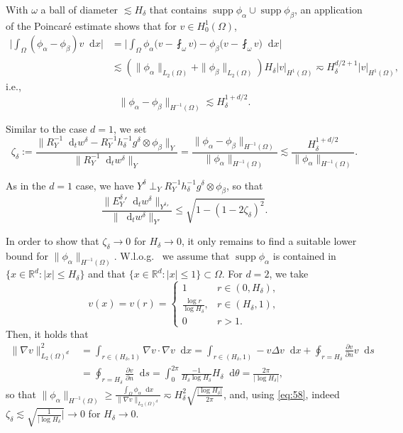 \documentclass{amsart}
\numberwithin{equation}{section}
\newcommand{\R}{\mathbb R}
\DeclareMathOperator{\supp}{supp}
\newcommand{\1}{\mathbb 1}
\newcommand*\diff{\mathop{}\!\mathrm{d}}
\newcommand{\be}{\begin{equation}}
\newcommand{\ee}{\end{equation}}
\begin{document}
With $\omega$ a ball of diameter $\lesssim H_\delta$ that contains $\supp \phi_\alpha \cup \supp \phi_\beta$, an application of the Poincar\'{e} estimate shows that for $v \in H^1_0(\Omega)$,
\begin{align*}
\Big|\int_\Omega (\phi_\alpha- \phi_\beta) v \diff x\Big|&=\Big|\int_\Omega \phi_\alpha\Big(v-\fint_\omega v\Big)-\phi_\beta\Big(v-\fint_\omega v\Big)\diff x\Big|
\\
&\lesssim (\|\phi_\alpha\|_{L_2(\Omega)} +\|\phi_\beta\|_{L_2(\Omega)}) H_\delta |v|_{H^1(\Omega)} \eqsim H_\delta^{d/2+1}  |v|_{H^1(\Omega)},
\end{align*}
i.e.,
$$
\| \phi_\alpha- \phi_\beta\|_{H^{-1}(\Omega)} \lesssim H_\delta^{1+d/2}.
$$

Similar to the case $d=1$, we set
\be \label{eq:58}
\zeta_\delta:=\frac{\|R_Y^{-1}\diff_t w^\delta-R_Y^{-1} h_\delta^{-1} g^\delta \otimes \phi_\beta\|_{Y}}{\|R_Y^{-1}\diff_t w^\delta\|_Y} =\frac{\|\phi_\alpha-\phi_\beta\|_{H^{-1}(\Omega)}}{\|\phi_\alpha\|_{H^{-1}(\Omega)}} \lesssim \frac{H_\delta^{1+d/2}}{\|\phi_\alpha\|_{H^{-1}(\Omega)}}.
\ee


As in the $d=1$ case, we have $Y^\delta \perp_Y R_Y^{-1} h_\delta^{-1} g^\delta \otimes \phi_\beta$, so that
$$
\frac{\|{E_Y^\delta}'\diff_t  w^\delta\|_{{Y^\delta}'}}{\|\diff_t  w^\delta\|_{Y'}} \leq \sqrt{1-(1-2 \zeta_\delta)^2}.
$$

In order to show that $\zeta_\delta \rightarrow 0$ for $H_\delta \rightarrow 0$,  it only remains to find a suitable lower bound for $\|\phi_\alpha\|_{H^{-1}(\Omega)}$. 
W.l.o.g.~ we assume that $\supp \phi_\alpha$ is contained in \mbox{$\{x \in \R^d\colon |x| \leq H_\delta\}$} and that $\{x \in \R^d\colon |x| \leq 1\} \subset \Omega$. For $d=2$, we take
$$
v(x)=v(r)=\left\{\begin{array}{cc} 1 & r \in (0,H_\delta),\\ \frac{\log r}{\log H_\delta}, &r \in (H_\delta,1),\\ 0 & r>1.\end{array}\right.
$$
Then, it holds that
\begin{align*}
\|\nabla v\|_{L_2(\Omega)^d}^2 &=\int_{r \in (H_\delta,1)} \nabla v \cdot \nabla v \diff x=\int_{r \in (H_\delta,1)} -v \Delta v \diff x+\oint_{r=H_\delta} \frac{\partial v}{\partial n} v \diff s\\
&=\oint_{r=H_\delta} \frac{\partial v}{\partial n} \diff s=
\int_0^{2 \pi} \frac{-1}{H_\delta \log H_\delta} H_\delta \diff \theta=\frac{2 \pi}{|\log H_\delta|},
\end{align*}
so that $\|\phi_\alpha\|_{H^{-1}(\Omega)} \geq \frac{\int_\Omega \phi_\alpha \diff x}{\|\nabla v\|_{L_2(\Omega)^d}}\eqsim
H_\delta^2 \sqrt{\frac{|\log H_\delta|}{2 \pi}}$,
and, using \eqref{eq:58}, indeed $\zeta_\delta \lesssim \sqrt{\frac{1}{|\log H_\delta}|} \rightarrow 0$ for $H_\delta \rightarrow 0$.
\end{document}
